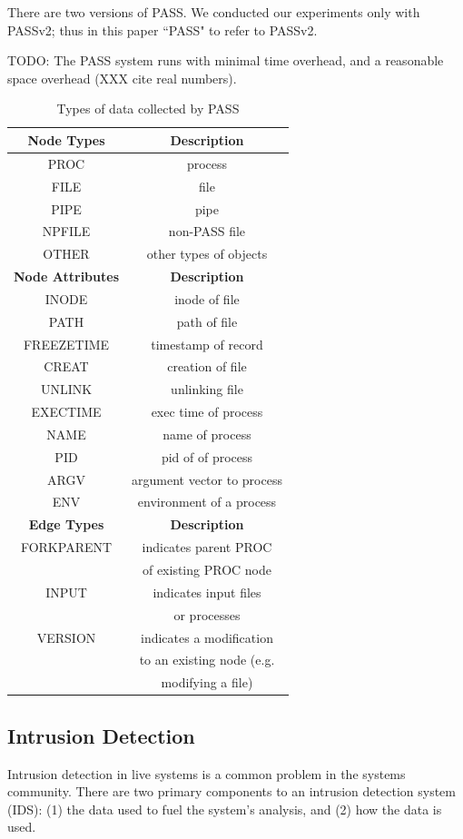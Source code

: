 \documentclass[10pt,twocolumn]{article}
\begin{document}
There are two versions of PASS. We conducted our experiments only with PASSv2; thus in this paper ``PASS" to refer to PASSv2.

TODO: The PASS system runs with minimal time overhead, and a reasonable space overhead (XXX cite real numbers).

\begin{table}[htdp]
\begin{center}
\begin{tabular}{|c|c|}
\hline
{\bf Node Types} & {\bf Description} \\
\hline
PROC & process \\
FILE & file \\
PIPE & pipe \\
NPFILE & non-PASS file \\
OTHER & other types of objects \\
\hline
{\bf Node Attributes} & {\bf Description} \\
\hline
INODE & inode of file \\
PATH & path of file \\
FREEZETIME & timestamp of record \\
CREAT & creation of file \\
UNLINK & unlinking file \\
EXECTIME & exec time of process\\
NAME & name of process \\
PID & pid of of process \\
ARGV & argument vector to process \\
ENV & environment of a process \\
\hline
{\bf Edge Types} & {\bf Description} \\
\hline
FORKPARENT & indicates parent PROC\\
&  of existing PROC node \\
INPUT & indicates input files\\
& or processes \\
VERSION & indicates a modification  \\
& to an existing node (e.g. \\
& modifying a file) \\
\hline
\end{tabular}
\end{center}
\label{passobjects}
\caption{Types of data collected by PASS}
\end{table}%



\subsection{Intrusion Detection}
Intrusion detection in live systems is a common problem in the systems community. There are two primary components to an intrusion detection system (IDS): (1) the data used to fuel the system's analysis, and (2) how the data is used.
\end{document}
